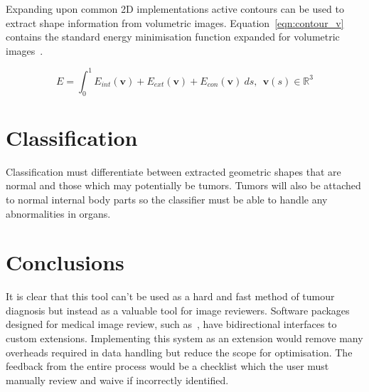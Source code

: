 \documentclass[journal]{IEEEtran}
\begin{document}
Expanding upon common 2D implementations active contours can be used to extract shape information from volumetric images.
Equation~\eqref{eqn:contour_v} contains the standard energy minimisation function expanded for volumetric images~\cite{nixon02feature,skalski13automatic}. 

\begin{equation}
	E = \int_0^{1} E_{int}(\mathbf{v}) + E_{ext}(\mathbf{v}) + E_{con}(\mathbf{v})\:ds,\:\:\mathbf{v}(s) \in \mathbb{R}^3
	\label{eqn:contour_v}
\end{equation}












\section{Classification}
\label{sec:class}

Classification must differentiate between extracted geometric shapes that are normal and those which may potentially be tumors.
Tumors will also be attached to normal internal body parts so the classifier must be able to handle any abnormalities in organs.







\section{Conclusions}
\label{sec:conclusions}

It is clear that this tool can't be used as a hard and fast method of tumour diagnosis but instead as a valuable tool for image reviewers.
Software packages designed for medical image review, such as~\cite{slicer}, have bidirectional interfaces to custom extensions.
Implementing this system as an extension would remove many overheads required in data handling but reduce the scope for optimisation.
The feedback from the entire process would be a checklist which the user must manually review and waive if incorrectly identified. 












\end{document}
